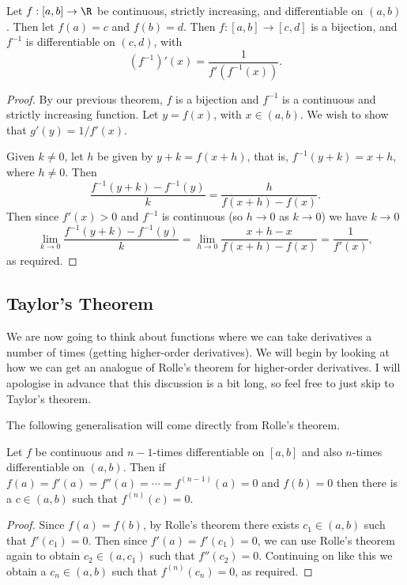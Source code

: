 \documentclass[a4paper]{scrartcl}
\begin{document}
\begin{theorem}
	Let $f:[a, b] \rightarrow \R$ be continuous, strictly increasing, and differentiable on $(a, b)$.
	Then let $f(a) = c$ and $f(b) = d$. Then $f:[a, b] \rightarrow [c, d]$ is a bijection, and $f^{-1}$ is differentiable on $(c, d)$, with
	$$
	(f^{-1})'(x) = \frac{1}{f'(f^{-1}(x))}.
	$$
\end{theorem}
\begin{proof}
	By our previous theorem, $f$ is a bijection and $f^{-1}$ is a continuous and strictly increasing function. Let $y = f(x)$, with $x \in (a, b)$. We wish to show that $g'(y) = 1/f'(x)$.

	Given $k \neq 0$, let $h$ be given by $y + k = f(x + h)$, that is, $f^{-1}(y + k) = x + h$, where $h \neq 0$. Then
	$$
	\frac{f^{-1}(y + k) - f^{-1}(y)}{k} = \frac{h}{f(x + h) - f(x)}.
	$$
	Then since $f'(x) > 0$ and $f^{-1}$ is continuous (so $h \rightarrow 0$ as $k \rightarrow 0$) we have $k \to 0$ 
	$$
	\lim_{k \to 0} \frac{f^{-1}(y + k) - f^{-1}(y)}{k} = \lim_{h \to 0} \frac{x + h - x}{f(x + h) - f(x)} = \frac{1}{f'(x)},
	$$
	as required.
\end{proof}

\subsection{Taylor's Theorem}

We are now going to think about functions where we can take derivatives a number of times (getting higher-order derivatives).
We will begin by looking at how we can get an analogue of Rolle's theorem for higher-order derivatives. I will apologise in advance that this discussion is a bit long, so feel free to just skip to Taylor's theorem.

The following generalisation will come directly from Rolle's theorem.
\begin{theorem}
	Let $f$ be continuous and $n-1$-times differentiable on $[a, b]$ and also $n$-times differentiable on $(a, b)$. Then if $f(a) = f'(a) = f''(a) = \cdots = f^{(n - 1)}(a) = 0$ and $f(b) = 0$ then there is a $c \in (a, b)$ such that $f^{(n)}(c) = 0$.
\end{theorem}
\begin{proof}
	Since $f(a) = f(b)$, by Rolle's theorem there exists $c_1 \in (a, b)$ such that $f'(c_1) = 0$. Then since $f'(a) = f'(c_1) = 0$, we can use Rolle's theorem again to obtain $c_2 \in (a, c_1)$ such that $f''(c_2) = 0$. Continuing on like this we obtain a $c_{n} \in (a, b)$ such that $f^{(n)}(c_n) = 0$, as required.
\end{proof}
\end{document}

